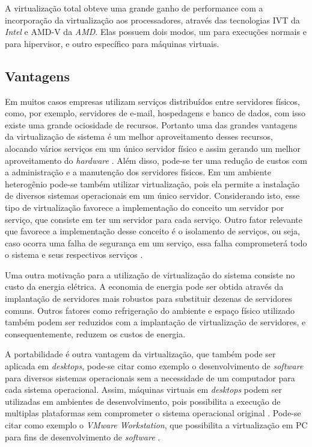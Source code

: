 A virtualização total obteve uma grande ganho de performance com a incorporação da virtualização aos processadores, através das 
tecnologias \ac{IVT} da \textit{Intel} e \ac{AMD-V} da \textit{AMD}. Elas possuem dois modos, um para execuções normais e para hipervisor, 
e outro específico para máquinas virtuais. 

\subsection{Vantagens}
\label{section:virtvantag}

Em muitos casos empresas utilizam serviços distribuídos entre servidores físicos, como, por exemplo, servidores de e-mail, hospedagens e 
banco de dados, com isso existe uma grande ociosidade de recursos. Portanto uma das grandes vantagens da virtualização de sistema é um melhor 
aproveitamento desses recursos, alocando vários serviços em um único servidor físico e assim gerando um melhor aproveitamento do \textit{hardware} 
\cite{moreira2006}. Além disso, pode-se ter uma redução de custos com a administração e a manutenção dos servidores físicos. Em um ambiente 
heterogênio pode-se também utilizar virtualização, pois ela permite a instalação de diversos sistemas operacionais em um único servidor.
Considerando isto, esse tipo de virtualização favorece a implementação do conceito um servidor por serviço, que consiste em ter um servidor
para cada serviço. Outro fator relevante que favorece a implementação desse conceito é o isolamento de serviços, ou seja, caso ocorra
uma falha de segurança em um serviço, essa falha comprometerá todo o sistema e seus respectivos serviços \cite{carissimi2008}.

Uma outra motivação para a utilização de virtualização do sistema consiste no custo da energia elétrica. A economia de energia pode ser obtida 
através da implantação de servidores mais robustos para substituir dezenas de servidores comuns. Outros fatores como refrigeração do ambiente e 
espaço físico utilizado também podem ser reduzidos com a implantação de virtualização de servidores, e consequentemente, reduzem os 
custos de energia.

A portabilidade é outra vantagem da virtualização, que também pode ser aplicada em \textit{desktops}, pode-se citar como exemplo o desenvolvimento 
de \textit{software} para diversos sistemas operacionais sem a necessidade de um computador para cada sistema operacional. Assim, 
máquinas virtuais em \textit{desktops} podem ser utilizadas em ambientes de desenvolvimento, pois possibilita a execução de multiplas 
plataformas sem comprometer o sistema operacional original \cite{carissimi2008}. Pode-se citar como exemplo o \textit{VMware Workstation}, que 
possibilita a virtualização em \ac{PC} para fins de desenvolvimento de \textit{software} \cite{vmware2016}.

